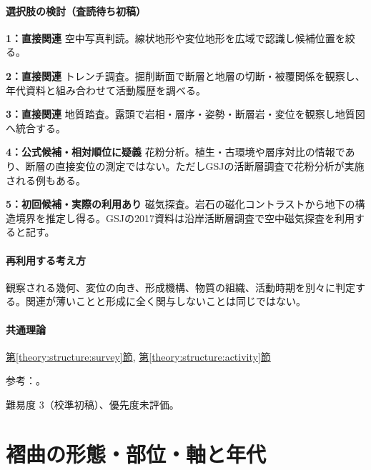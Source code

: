 \paragraph{選択肢の検討（査読待ち初稿）}\mbox{}\par

\noindent\textbf{1：直接関連} 空中写真判読。線状地形や変位地形を広域で認識し候補位置を絞る。\par

\noindent\textbf{2：直接関連} トレンチ調査。掘削断面で断層と地層の切断・被覆関係を観察し、年代資料と組み合わせて活動履歴を調べる。\par

\noindent\textbf{3：直接関連} 地質踏査。露頭で岩相・層序・姿勢・断層岩・変位を観察し地質図へ統合する。\par

\noindent\textbf{4：公式候補・相対順位に疑義} 花粉分析。植生・古環境や層序対比の情報であり、断層の直接変位の測定ではない。ただしGSJの活断層調査で花粉分析が実施される例もある。\par

\noindent\textbf{5：初回候補・実際の利用あり} 磁気探査。岩石の磁化コントラストから地下の構造境界を推定し得る。GSJの2017資料は沿岸活断層調査で空中磁気探査を利用すると記す。\par

\paragraph{再利用する考え方} 観察される幾何、変位の向き、形成機構、物質の組織、活動時期を別々に判定する。関連が薄いことと形成に全く関与しないことは同じではない。

\paragraph{共通理論} \hyperref[theory:structure:survey]{第\ref*{theory:structure:survey}節}, \hyperref[theory:structure:activity]{第\ref*{theory:structure:activity}節}

\par 参考：\cite{str_coastal2017,str_pollen2014}。

\par 難易度 3（校準初稿）、優先度未評価。

\section{褶曲の形態・部位・軸と年代}

